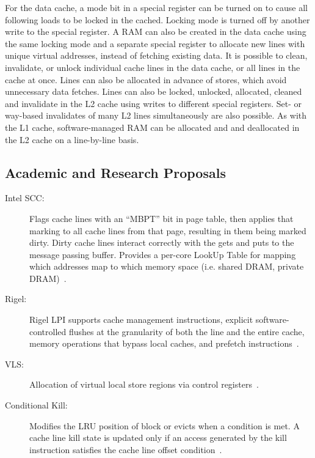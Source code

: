 For the data cache, a mode bit in a special register can be turned on to cause all following loads to be locked in the cached. Locking mode is turned off by another write to the special register.
A RAM can also be created in the data cache using the same locking mode and a separate special register to allocate new lines with unique virtual addresses, instead of fetching existing data.
It is possible to clean, invalidate, or unlock individual cache lines in the data cache, or all lines in the cache at once. Lines can also be allocated in advance of stores, which avoid unnecessary data fetches.
Lines can also be locked, unlocked, allocated, cleaned and invalidate in the L2 cache using writes to different special registers. Set- or way-based invalidates of many L2 lines simultaneously are also possible.
As with the L1 cache, software-managed RAM can be allocated and  and deallocated in the L2 cache on a line-by-line basis.

\subsection{Academic and Research Proposals}


\begin{description}
\item [Intel SCC:] 
Flags cache lines with an ``MBPT'' bit in page table, then applies that marking to all cache lines from that page, resulting in them being marked dirty. Dirty cache lines interact correctly with the gets and puts to the message passing buffer.
Provides a per-core LookUp Table for mapping which addresses map to which memory space (i.e. shared DRAM, private DRAM)~\cite{clauss2011evaluation}.
\item [Rigel:] Rigel LPI supports cache management instructions, explicit software-controlled flushes at the granularity of both the line and the entire cache, memory operations that bypass local caches, and prefetch instructions~\cite{kelm-isca09}.
\item [VLS:] Allocation of virtual local store regions via control registers~\cite{Cook:EECS-2009-131}.
\item[Conditional Kill:] Modifies the LRU position of block or evicts when a condition is met. A cache line kill state is updated only if an access generated by the kill instruction satisfies the cache line offset condition~\cite{jain-iccad01}.
\end{description}

